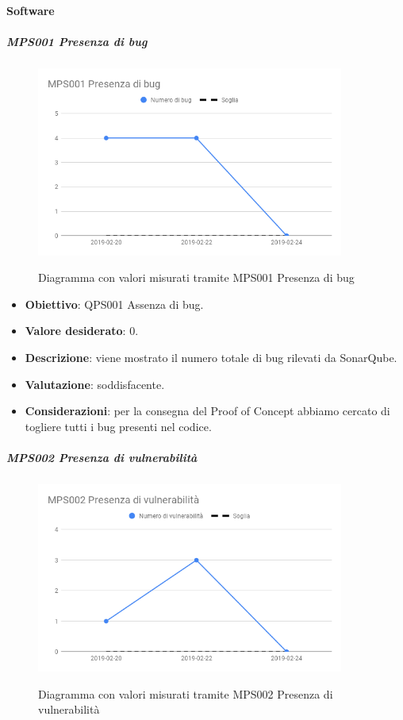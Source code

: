 	\paragraph{Software}

	\subparagraph{MPS001 Presenza di bug}

    \begin{figure}[H]
        \centering
        \includegraphics[width=0.9\textwidth]{img/cruscotti/RP/MPS001.png}
        \label{immaginePresenzaBugRP}
        \caption{Diagramma con valori misurati tramite MPS001 Presenza di bug}
    \end{figure}

    \begin{itemize}
        \item \textbf{Obiettivo}: QPS001 Assenza di bug.
        \item \textbf{Valore desiderato}: 0.
        \item \textbf{Descrizione}: viene mostrato il numero totale di bug rilevati da SonarQube.
        \item \textbf{Valutazione}: soddisfacente.
        \item \textbf{Considerazioni}: per la consegna del Proof of Concept abbiamo cercato di togliere tutti i bug presenti nel codice.
    \end{itemize}

    \subparagraph{MPS002 Presenza di vulnerabilità}

    \begin{figure}[H]
        \centering
        \includegraphics[width=0.9\textwidth]{img/cruscotti/RP/MPS002.png}
        \label{immaginePresenzaVulnerabilitàRP}
        \caption{Diagramma con valori misurati tramite MPS002 Presenza di vulnerabilità}
    \end{figure}

